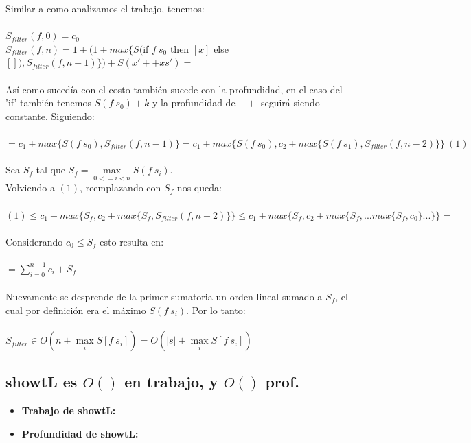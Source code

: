 \documentclass[12pt]{article}
\begin{document}
\begin{itemize}
Similar a como analizamos el trabajo, tenemos: \\
\\
    $S_{filter}(f, 0) = c_0$ \\
    $S_{filter}(f, n) = 1 + ( 1 + max\{ S($if $f\ s_0$ then $[x]$ else $[]), S_{filter}(f, n-1)\} ) + S(x'++xs') = $ \\
\\
    Así como sucedía con el costo también sucede con la profundidad, en el caso del 'if' también tenemos $S(f\ s_0) + k$ y la profundidad de $++$ seguirá siendo constante. Siguiendo:\\
\\
    $ = c_1 + max\{ S(f\ s_0), S_{filter}(f, n-1) \} = c_1 + max\{ S(f\ s_0), c_2 + max\{S(f\ s_1), S_{filter}(f, n-2) \} \} \ (1) $ \\
\\
    Sea $S_f$ tal que $S_f = \max\limits_{0<=i<n} S(f\ s_i)$. \\
    Volviendo a $(1)$, reemplazando con $S_f$ nos queda:\\
\\
    $(1) \leq 
    c_1 + max\{ S_f, c_2 + max\{S_f, S_{filter}(f, n-2) \} \} \leq 
    c_1 + max\{ S_f, c_2 + max\{S_f, ... max\{ S_f, c_0 \} ... \} \} = $\\
\\
    Considerando $c_0 \leq S_f$ esto resulta en:\\
\\
    $ = \sum\limits_{i=0}^{n-1} c_i + S_f $\\
\\
    Nuevamente se desprende de la primer sumatoria un orden lineal sumado a $S_f$, el cual por definición era el máximo $S(f\ s_i)$. Por lo tanto: \\
\\
    $S_{filter} \in O(n + \max\limits_{i} S[f\ s_i] ) = O(|s| + \max\limits_{i} S[f\ s_i] )$\\
    
\end{itemize}


\subsection{showtL es $O()$ en trabajo, y $O()$ prof.}

\begin{itemize}

\item \textbf{Trabajo de showtL:}


\item \textbf{Profundidad de showtL:}
    
\end{itemize}
\end{document}
